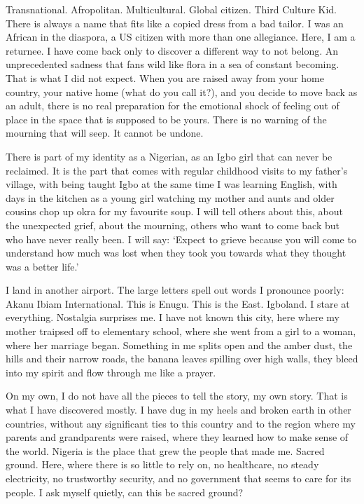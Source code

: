 \documentclass[../main.tex]{subfiles}
\begin{document}
\begin{multicols}{2}
Transnational. Afropolitan. Multicultural. Global citizen. Third Culture Kid. There is always a name that fits like a copied dress from a bad tailor. I was an African in the diaspora, a US citizen with more than one allegiance. Here, I am a returnee. I have come back only to discover a different way to not belong. An unprecedented sadness that fans wild like flora in a sea of constant becoming. That is what I did not expect. When you are raised away from your home country, your native home (what do you call it?), and you decide to move back as an adult, there is no real preparation for the emotional shock of feeling out of place in the space that is supposed to be yours. There is no warning of the mourning that will seep. It cannot be undone. 

There is part of my identity as a Nigerian, as an Igbo girl that can never be reclaimed. It is the part that comes with regular childhood visits to my father’s village, with being taught Igbo at the same time I was learning English, with days in the kitchen as a young girl watching my mother and aunts and older cousins chop up okra for my favourite soup. I will tell others about this, about the unexpected grief, about the mourning, others who want to come back but who have never really been. I will say: ‘Expect to grieve because you will come to understand how much was lost when they took you towards what they thought was a better life.’ 

\lettrine{I}{} land in another airport. The large letters spell out words I pronounce poorly: Akanu Ibiam International. This is Enugu. This is the East. Igboland. I stare at everything. Nostalgia surprises me. I have not known this city, here where my mother traipsed off to elementary school, where she went from a girl to a woman, where her marriage began. Something in me splits open and the amber dust, the hills and their narrow roads, the banana leaves spilling over high walls, they bleed into my spirit and flow through me like a prayer. 

On my own, I do not have all the pieces to tell the story, my own story. That is what I have discovered mostly. I have dug in my heels and broken earth in other countries, without any significant ties to this country and to the region where my parents and grandparents were raised, where they learned how to make sense of the world. Nigeria is the place that grew the people that made me. Sacred ground. Here, where there is so little to rely on, no healthcare, no steady electricity, no trustworthy security, and no government that seems to care for its people. I ask myself quietly, can this be sacred ground? 


\end{multicols}
\end{document}
